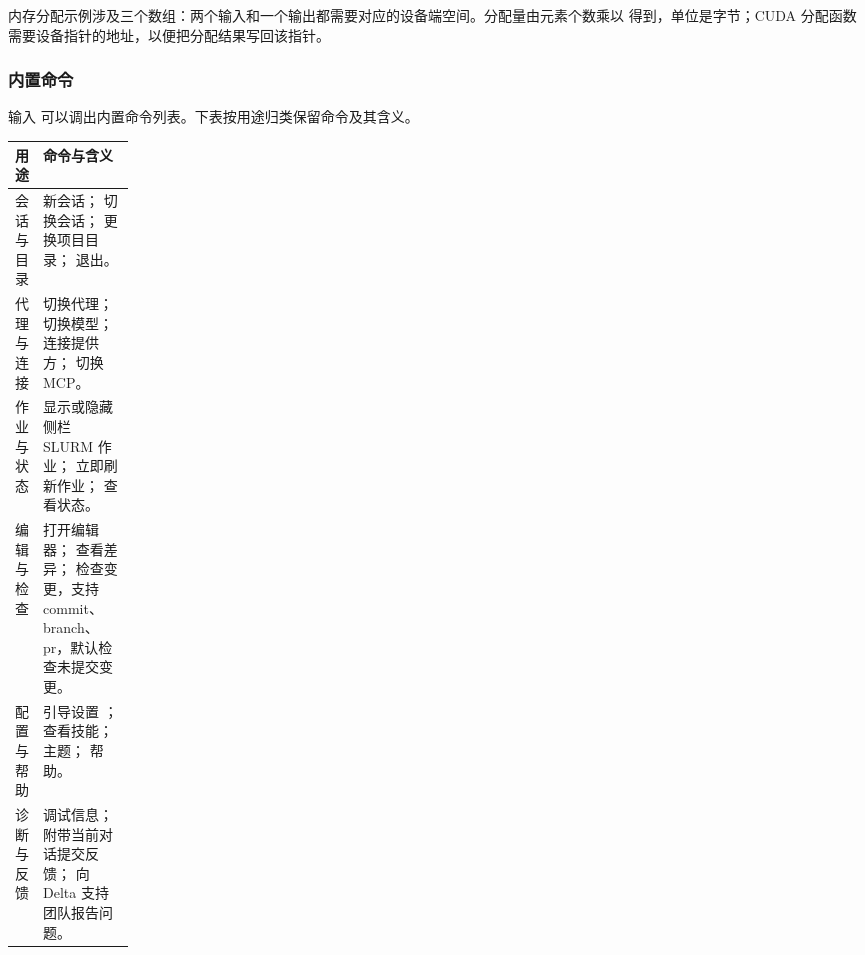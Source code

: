 内存分配示例涉及三个数组：两个输入和一个输出都需要对应的设备端空间。分配量由元素个数乘以  得到，单位是字节；CUDA 分配函数需要设备指针的地址，以便把分配结果写回该指针。

\subsubsection{内置命令}
输入 \code{/} 可以调出内置命令列表。下表按用途归类保留命令及其含义。
\begin{center}
\small
\begin{tabularx}{\linewidth}{@{}p{0.14\linewidth}Y@{}}
\toprule
用途 & 命令与含义 \\
\midrule
会话与目录 &  新会话； 切换会话； 更换项目目录； 退出。\\
代理与连接 &  切换代理； 切换模型； 连接提供方； 切换 MCP。\\
作业与状态 &  显示或隐藏侧栏 SLURM 作业； 立即刷新作业； 查看状态。\\
编辑与检查 &  打开编辑器； 查看差异； 检查变更，支持 commit、branch、pr，默认检查未提交变更。\\
配置与帮助 &  引导设置 ； 查看技能； 主题； 帮助。\\
诊断与反馈 &  调试信息； 附带当前对话提交反馈； 向 Delta 支持团队报告问题。\\
\bottomrule
\end{tabularx}
\end{center}
